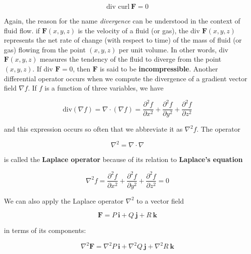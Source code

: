 \documentclass{article}
\begin{document}
\begin{equation*}
    \text{div curl} \ \mathbf{F} = 0
\end{equation*}

Again, the reason for the name \textit{divergence} can be understood in the context of fluid flow. if $\mathbf{F}(x,y,z)$ is the velocity of a fluid (or gas), the div $\mathbf{F}(x,y,z)$ represents the net rate of change (with respect to time) of the mass of fluid (or gas) flowing from the point $(x,y,z)$ per unit volume. In other words, div $\mathbf{F}(x,y,z)$ measures the tendency of the fluid to diverge from the point $(x,y,z)$. If div $\mathbf{F} = 0$, then $\mathbf{F}$ is said to be \textbf{incompressible}. Another differential operator occurs when we compute the divergence of a gradient vector field $\nabla f$. If $f$ is a function of three variables, we have 

\begin{equation*}
    \text{div}(\nabla f) = \nabla \cdot (\nabla f) = \frac{\partial^2 f}{\partial x^2} + \frac{\partial^2 f}{\partial y^2} + \frac{\partial^2 f} {\partial z^2} 
\end{equation*}

and this expression occurs so often that we abbreviate it as $\nabla^2 f$. The operator

\begin{equation*}
    \nabla^2 = \nabla \cdot \nabla
\end{equation*}

is called the \textbf{Laplace operator} because of its relation to \textbf{Laplace's equation}

\begin{equation*}
    \nabla^2 f = \frac{\partial^2 f}{\partial x^2} + \frac{\partial^2 f}{\partial y^2} + \frac{\partial^2 f} {\partial z^2}  = 0
\end{equation*}

We can also apply the Laplace operator $\nabla^2$ to a vector field

\begin{equation*}
    \mathbf{F} = P \ \mathbf{i} + Q \ \mathbf{j} + R \ \mathbf{k}
\end{equation*}

in terms of its components:

\begin{equation*}
    \nabla^2 \mathbf{F} = \nabla^2 P \ \mathbf{i} + \nabla^2 Q \ \mathbf{j} + \nabla^2 R \ \mathbf{k}
\end{equation*}
\end{document}
